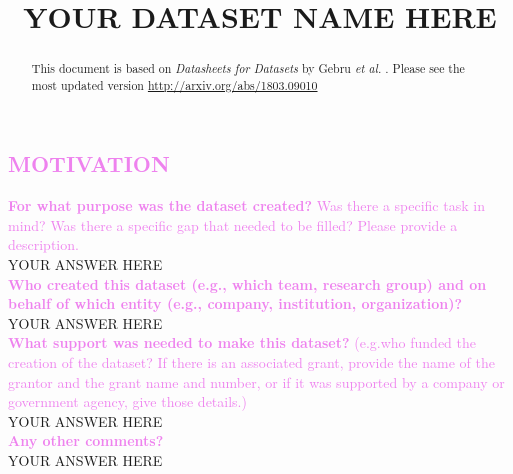 \documentclass[letterpaper, 10 pt, conference]{ieeeconf}  %
\title{\LARGE \bf
YOUR DATASET NAME HERE
}
\newcommand{\sectioncolor}{violet}
\begin{document}
\maketitle
\thispagestyle{empty}
\pagestyle{empty}


\begin{abstract}

This document is based on \textit{Datasheets for Datasets} by Gebru \textit{et
al.} \cite{gebruDatasheetsDatasets2020}. Please see the most updated version
\href{here}{http://arxiv.org/abs/1803.09010}

\end{abstract}


\begin{mdframed}[linecolor=\sectioncolor]
\section*{\textcolor{\sectioncolor}{
    MOTIVATION
}}
\end{mdframed}
    \textcolor{\sectioncolor}{\textbf{
    For what purpose was the dataset created?
    }
    Was there a specific task in mind? Was there
    a specific gap that needed to be filled? Please provide a description.
    } \\
    YOUR ANSWER HERE \\
    
    \textcolor{\sectioncolor}{\textbf{
    Who created this dataset (e.g., which team, research group) and on behalf
    of which entity (e.g., company, institution, organization)?
    }
    } \\
    YOUR ANSWER HERE \\
    
    \textcolor{\sectioncolor}{\textbf{
    What support was needed to make this dataset?
    }
    (e.g.who funded the creation of the dataset? If there is an associated
    grant, provide the name of the grantor and the grant name and number, or if
    it was supported by a company or government agency, give those details.)
    } \\
    YOUR ANSWER HERE \\
    
    \textcolor{\sectioncolor}{\textbf{
    Any other comments?
    }} \\
    YOUR ANSWER HERE \\
\end{document}
